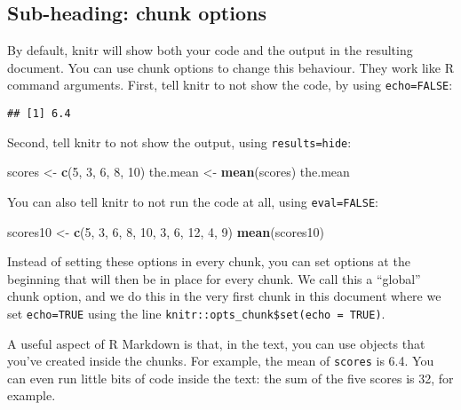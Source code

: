 \documentclass[
]{article}
\newenvironment{Shaded}{\begin{snugshade}}{\end{snugshade}}
\newcommand{\DecValTok}[1]{\textcolor[rgb]{0.00,0.00,0.81}{#1}}
\newcommand{\FunctionTok}[1]{\textcolor[rgb]{0.13,0.29,0.53}{\textbf{#1}}}
\newcommand{\NormalTok}[1]{#1}
\newcommand{\OtherTok}[1]{\textcolor[rgb]{0.56,0.35,0.01}{#1}}
\begin{document}
\subsection{Sub-heading: chunk options}\label{sub-heading-chunk-options}

By default, knitr will show both your code and the output in the
resulting document. You can use chunk options to change this behaviour.
They work like R command arguments. First, tell knitr to not show the
code, by using \texttt{echo=FALSE}:

\begin{verbatim}
## [1] 6.4
\end{verbatim}

Second, tell knitr to not show the output, using
\texttt{results=\textquotesingle{}hide}:

\begin{Shaded}
\begin{Highlighting}[]
\NormalTok{scores }\OtherTok{\textless{}{-}} \FunctionTok{c}\NormalTok{(}\DecValTok{5}\NormalTok{, }\DecValTok{3}\NormalTok{, }\DecValTok{6}\NormalTok{, }\DecValTok{8}\NormalTok{, }\DecValTok{10}\NormalTok{)}
\NormalTok{the.mean }\OtherTok{\textless{}{-}} \FunctionTok{mean}\NormalTok{(scores)}
\NormalTok{the.mean}
\end{Highlighting}
\end{Shaded}

You can also tell knitr to not run the code at all, using
\texttt{eval=FALSE}:

\begin{Shaded}
\begin{Highlighting}[]
\NormalTok{scores10 }\OtherTok{\textless{}{-}} \FunctionTok{c}\NormalTok{(}\DecValTok{5}\NormalTok{, }\DecValTok{3}\NormalTok{, }\DecValTok{6}\NormalTok{, }\DecValTok{8}\NormalTok{, }\DecValTok{10}\NormalTok{, }\DecValTok{3}\NormalTok{, }\DecValTok{6}\NormalTok{, }\DecValTok{12}\NormalTok{, }\DecValTok{4}\NormalTok{, }\DecValTok{9}\NormalTok{)}
\FunctionTok{mean}\NormalTok{(scores10)}
\end{Highlighting}
\end{Shaded}

Instead of setting these options in every chunk, you can set options at
the beginning that will then be in place for every chunk. We call this a
``global'' chunk option, and we do this in the very first chunk in this
document where we set \texttt{echo=TRUE} using the line
\texttt{knitr::opts\_chunk\$set(echo\ =\ TRUE)}.

A useful aspect of R Markdown is that, in the text, you can use objects
that you've created inside the chunks. For example, the mean of
\texttt{scores} is 6.4. You can even run little bits of code inside the
text: the sum of the five scores is 32, for example.
\end{document}
